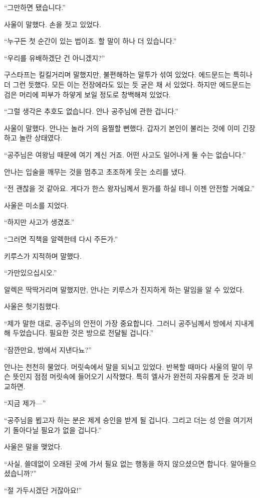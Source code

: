 ``그만하면 됐습니다.''

사울이 말했다. 손을 젓고 있었다.

``누구든 첫 순간이 있는 법이죠. 할 말이 하나 더 있습니다.''

``우리를 유배하겠단 건 아니겠지?''

구스타프는 킬킬거리며 말했지만, 불편해하는 말투가 섞여 있었다. 에드문드는 특히나 더 그런 듯했다. 모든 이는 전장에라도 있는 듯 굳은 채 서 있었다. 하지만 에드문드는 검은 머리에 피부가 하얗게 보일 정도로 창백해져 있었다.

``그럴 생각은 추호도 없습니다. 안나 공주님에 관한 겁니다.''

사울이 말했다. 안나는 놀라 거의 움찔할 뻔했다. 갑자기 본인이 불리는 것에 이미 긴장하고 놀란 상태였다.

``공주님은 여왕님 때문에 여기 계신 거죠. 어떤 사고도 일어나게 둘 수는 없습니다.''

안나는 입술을 깨무는 것을 멈추고 초조하게 웃는 소리를 냈다.

``전 괜찮을 것 같아요. 게다가 한스 왕자님께서 뭔가를 하실 테니 이젠 안전할 거예요.''

사울은 미소를 지었다.

``하지만 사고가 생겼죠.''

``그러면 직책을 알렉한테 다시 주든가.''

키루스가 지적하며 말했다.

``가만있으십시오.''

알렉은 딱딱거리며 말했지만, 안나는 키루스가 진지하게 하는 말임을 알 수 있었다.

사울은 헛기침했다.

``제가 말한 대로, 공주님의 안전이 가장 중요합니다. 그러니 공주님께서 방에서 지내게 해 두었습니다. 필요한 것은 방으로 전달될 겁니다.''

``잠깐만요, 방에서 지낸다뇨?''

안나는 천천히 물었다. 머릿속에서 말을 되뇌고 있었다. 반복할 때마다 사울의 말이 무슨 뜻인지 점점 머릿속에 들어오기 시작했다. 특히 엘사가 완전히 자유롭게 둔 것과 비교하면.

``지금 제가—''

``공주님을 뵙고자 하는 분은 제게 승인을 받게 될 겁니다. 그리고 더는 성 안을 여기저기 돌아다닐 필요가 없을 겁니다.''

사울은 말을 맺었다.

``사실, 쓸데없이 오래된 곳에 가서 필요 없는 행동을 하지 않으셨으면 합니다. 알아들으셨습니까?''

``절 가두시겠단 거잖아요!''

